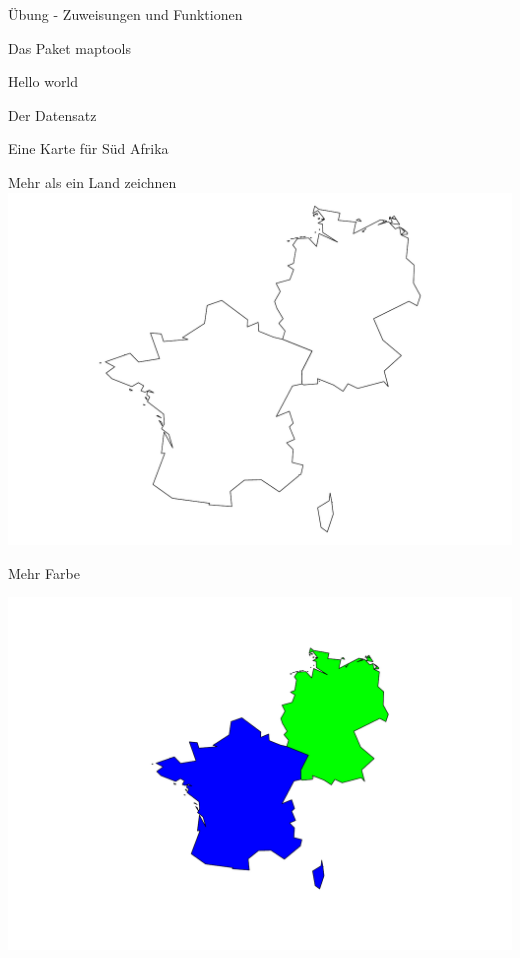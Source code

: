 \documentclass[ignorenonframetext,]{beamer}
\newenvironment{Shaded}{\begin{snugshade}}{\end{snugshade}}
\newcommand{\DataTypeTok}[1]{\textcolor[rgb]{0.74,0.68,0.62}{\underline{#1}}}
\newcommand{\KeywordTok}[1]{\textcolor[rgb]{0.26,0.66,0.93}{\textbf{#1}}}
\newcommand{\NormalTok}[1]{\textcolor[rgb]{0.74,0.68,0.62}{#1}}
\newcommand{\OperatorTok}[1]{\textcolor[rgb]{0.74,0.68,0.62}{#1}}
\newcommand{\StringTok}[1]{\textcolor[rgb]{0.02,0.61,0.04}{#1}}
\begin{document}
\begin{frame}[fragile]{Übung - Zuweisungen und Funktionen}
\begin{frame}[fragile]{Das Paket maptools}
\begin{frame}[fragile]{Hello world}
\begin{frame}[fragile]{Der Datensatz}
\begin{frame}[fragile]{Eine Karte für Süd Afrika}
\begin{frame}[fragile]{Mehr als ein Land zeichnen}
\includegraphics{Geomedizin_files/figure-beamer/unnamed-chunk-72-1.pdf}

\end{frame}

\begin{frame}[fragile]{Mehr Farbe}
\protect\hypertarget{mehr-farbe}{}

\begin{Shaded}
\end{Shaded}

\includegraphics{Geomedizin_files/figure-beamer/unnamed-chunk-73-1.pdf}


\end{frame}
\end{frame}
\end{frame}
\end{frame}
\end{frame}
\end{frame}
\end{document}
